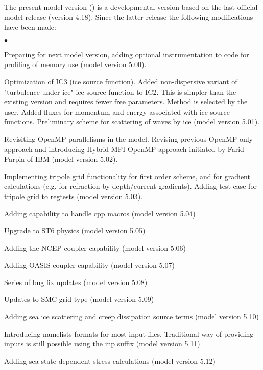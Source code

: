 \vspace{\baselineskip} 
\noindent 
The present model version (\WWver) is a developmental version based on the
last official model release (version 4.18). Since the latter release the
following modifications have been made:

\begin{list}{$\bullet$}{\rightmargin 5mm \parsep 0mm \itemsep 0mm}

\item Preparing for next model version, adding optional instrumentation to code
      for profiling of memory use (model version 5.00). 

\item Optimization of IC3 (ice source function). Added non-dispersive variant of "turbulence under ice" ice source function to IC2. This is simpler than the existing version and requires fewer free parameters. Method is selected by the user. Added fluxes for momentum and energy associated with ice source functions. Preliminary scheme for scattering of waves by ice (model version 5.01).

\item Revisiting OpenMP parallelisms in the model. Revising previous
      OpenMP-only approach and introducing Hybrid MPI-OpenMP approach
      initiated by Farid Parpia of IBM (model version 5.02).

\item Implementing tripole grid functionality for first order scheme, and for gradient calculations (e.g. for refraction by depth/current gradients). Adding test case for tripole grid to regtests (model version 5.03).

\item Adding capability to handle cpp macros (model version 5.04)

\item Upgrade to ST6 physics (model version 5.05)

\item Adding the NCEP coupler capability (model version 5.06)

\item Adding OASIS coupler capability (model version 5.07)

\item Series of bug fix updates (model version 5.08)

\item Updates to SMC grid type (model version 5.09) 

\item Adding sea ice scattering and creep dissipation source terms (model version 5.10)

\item Introducing namelists formats for most input files. Traditional way of providing inputs is still possible using the inp suffix (model version 5.11)

\item Adding sea-state dependent stress-calculations (model version 5.12)

\end{list}

